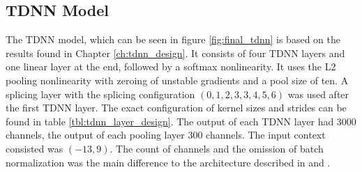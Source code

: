 \subsection{TDNN Model}
The TDNN model, which can be seen in figure \ref{fig:final_tdnn} is based on the results found in Chapter \ref{ch:tdnn_design}. It consists of four TDNN layers and one linear layer at the end, followed by a softmax nonlinearity. It uses the L2 pooling nonlinearity with zeroing of unstable gradients and a pool size of ten. A splicing layer with the splicing configuration $(0, 1, 2, 3, 3, 4, 5, 6)$ was used after the first TDNN layer. The exact configuration of kernel sizes and strides can be found in table \ref{tbl:tdnn_layer_design}. The output of each TDNN layer had 3000 channels, the output of each pooling layer 300 channels. The input context consisted was $(-13, 9)$. The count of channels and the omission of batch normalization was the main difference to the architecture described in \cite{peddinti2015reverberation} and \cite{peddinti2015jhu}. \\ \\
